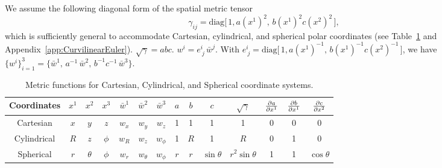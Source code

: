 \documentclass[10pt,preprint]{aastex}
\begin{document}
We assume the following diagonal form of the spatial metric tensor
\begin{equation}
  \gamma_{ij}=\mbox{diag}\big[\,1,a(x^{1})^{2},\,b(x^{1})^{2}c(x^{2})^{2}\,\big], 
\end{equation}
which is sufficiently general to accommodate Cartesian, cylindrical, and spherical polar coordinates (see Table~\ref{tab:metricFunctions} and Appendix~\ref{app:CurvilinearEuler}).  
$\sqrt{\gamma}=abc$.  $w^{i}=e^{i}_{~j}\,\bar{w}^{j}$.  
With $e^{i}_{~j}=\mbox{diag}\big[\,1,a(x^{1})^{-1},\,b(x^{1})^{-1}c(x^{2})^{-1}\,\big]$, we have $\{w^{i}\}_{i=1}^{3}=\{\bar{w}^{1},\,a^{-1}\,\bar{w}^{2},\,b^{-1}c^{-1}\,\bar{w}^{3}\}$.  
\begin{table}
  \begin{center}
  \caption{Metric functions for Cartesian, Cylindrical, and Spherical coordinate systems.\label{tab:metricFunctions}}
  \begin{tabular}{cccccccccccccc}
    \midrule
    Coordinates & $x^{1}$ & $x^{2}$ & $x^{3}$ & $\bar{w}^{1}$ & $\bar{w}^{2}$ & $\bar{w}^{3}$ & $a$ & $b$ & $c$ & $\sqrt{\gamma}$
    & $\frac{\partial a}{\partial x^{1}}$ & $\frac{\partial b}{\partial x^{1}}$ & $\frac{\partial c}{\partial x^{2}}$ \\
    \midrule
    \midrule
    Cartesian & $x$ & $y$ & $z$ & $w_{x}$ & $w_{y}$ & $w_{z}$ & 1 & 1 & 1 & 1 & 0 & 0 & 0 \\
    Cylindrical & $R$ & $z$ & $\phi$ & $w_{R}$ & $w_{z}$ & $w_{\phi}$ & 1 & $R$ & 1 & $R$ & 0 & 1 & 0 \\
    Spherical & $r$ & $\theta$ & $\phi$ & $w_{r}$ & $w_{\theta}$ & $w_{\phi}$ & $r$ & $r$ & $\sin\theta$ & $r^{2}\sin\theta$ & 1 & 1 & $\cos\theta$ \\
    \midrule
    \midrule
  \end{tabular}
  \end{center}
\end{table}
\end{document}
